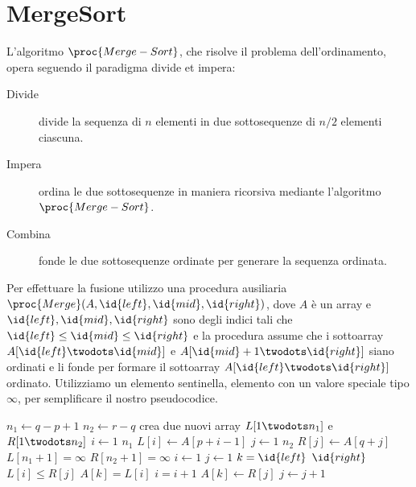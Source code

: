 \section{MergeSort}
L'algoritmo $\proc{Merge-Sort}$, che risolve il problema dell'ordinamento, opera seguendo il paradigma divide et impera:
\begin{description}
    \item[Divide]divide la sequenza di $n$ elementi in due sottosequenze di $n/2$ elementi ciascuna.
    \item[Impera]ordina le due sottosequenze in maniera ricorsiva mediante l'algoritmo $\proc{Merge-Sort}$.
    \item[Combina]fonde le due sottosequenze ordinate per generare la sequenza ordinata.
\end{description}
Per effettuare la fusione utilizzo una procedura ausiliaria $\proc{Merge}(A,\id{left},\id{mid},\id{right})$,
dove $A$ è un array e $\id{left},\id{mid},\id{right}$ sono degli indici tali che
$\id{left} \leq \id{mid} \leq \id{right}$ e la procedura assume che i sottoarray
$A[\id{left} \twodots \id{mid}]$ e $A[\id{mid}+1 \twodots \id{right}]$ siano ordinati
e li fonde per formare il sottoarray $A[\id{left} \twodots \id{right}]$ ordinato.
Utilizziamo un elemento sentinella, elemento con un valore speciale tipo $\infty$,
per semplificare il nostro pseudocodice.
\begin{codebox}
\li $n_1 \gets q - p + 1$
\li $n_2 \gets r - q$
\li crea due nuovi array $L[1 \twodots n_1]$ e $R[1 \twodots n_2]$
\li \For $i \gets 1$ \To $n_1$
         \Do
\li      $L[i] \gets A[p+i-1]$
        \End
\li \For $j \gets 1$ \To $n_2$
        \Do
\li      $R[j] \gets A[q+j]$
        \End
\li $L[n_1+1] = \infty$
\li $R[n_2+1] = \infty$
\li $i \gets 1$
\li $j \gets 1$
\li \For $k = \id{left}$ \To $\id{right}$
    \Do
\li      \If $L[i] \leq R[j]$
         \Then
\li              $A[k] = L[i]$
\li              $i = i+1$
         \End
\li      \Else $A[k] \gets R[j]$
\li            $j \gets j+1$
    \End
\end{codebox}


